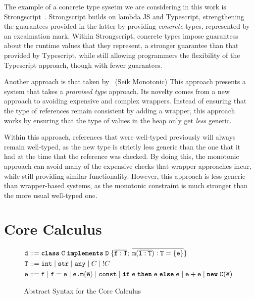 \documentclass{llncs}
\newcommand{\kewif}{\texttt{\textbf{if}}}
\newcommand{\kewthen}{\texttt{\textbf{then}}}
\newcommand{\kewelse}{\texttt{\textbf{else}}}
\newcommand{\kewnew}{\texttt{\textbf{new}}}
\newcommand{\kewclass}{\texttt{\textbf{class}}}
\newcommand{\kewimplements}{\texttt{\textbf{implements}}}
\newcommand{\class}[4]{\ensuremath\kewclass\; \texttt{#1}\; \kewimplements\; \texttt{#2} \;\{#3;\;#4\}}
\newcommand{\field}[2]{\ensuremath \texttt{#1} : \texttt{#2}}
\newcommand{\method}[4]{\ensuremath {\texttt{#1}}({#2}):\texttt{#3} = \{\texttt{#4}\}}
\newcommand{\ifabs}[3]{\kewif \; #1 \;\kewthen\; #2 \;\kewelse\; #3}
\newcommand{\opplus}[2]{#1 + #2}
\newcommand{\newclass}[2]{\kewnew\;\texttt{#1}(#2)}
\newcommand{\strt}{\texttt{str}}
\newcommand{\intt}{\texttt{int}}
\newcommand{\anyt}{\texttt{any}}
\newcommand{\vbar}{\;|\;}
\begin{document}
The example of a concrete type sysetm we are considering in this work is
Strongscript~\cite{stongscript}. Strongscript builds on lambda JS and 
Typescript, strengthening the guarantees provided in the latter by providing
\emph{concrete} types, represented by an excalmation mark. Within Strongscript,
concrete types impose guarantess about the runtime values that they represent, 
a stronger guarantee than that provided by Typescript, while still allowing
programmers the flexibility of the Typescript approach, though with fewer
guarantees.

Another approach is that taken by~\cite{seik-monotonic} (Seik Monotonic)
This approach presents a system that takes a \emph{promised type} approach.
Its novelty comes from a new approach to avoiding expensive and complex
wrappers. Instead of ensuring that the type of references remain consistent
by adding a wrapper, this approach works by ensuring that the type of values in
the heap only get \emph{less} generic.

Within this approach, references that were well-typed previously will always
remain well-typed, as the new type is strictly less generic than the one that
it had at the time that the reference was checked. By doing this, the monotonic
approach can avoid many of the expensive checks that wrapper approaches incur, 
while still providing similar functionality. However, this approach is less
generic than wrapper-based systems, as the monotonic constraint is much stronger
than the more usual well-typed one.

\section{Core Calculus}

\begin{figure}
\begin{align*}
\texttt{d}&::= \class{C}{D}{\overline{\field{f}{T}}}{\overline{\method{m}{\overline{\field{l}{T}}}{T}{e}}}\\
\texttt{T} &::= \intt \vbar \strt \vbar \anyt \vbar C \vbar !C\\
\texttt{e}&::= \texttt{f} \vbar \texttt{f} = \texttt{e} \vbar \texttt{e.m}(\overline{\texttt{e}}) \vbar \texttt{const} \vbar 
\ifabs{\texttt{e}}{\texttt{e}}{\texttt{e}} \vbar \opplus{\texttt{e}}{\texttt{e}} \vbar \newclass{\texttt{C}}{\overline{\texttt{e}}}
\end{align*}

\caption{Abstract Syntax for the Core Calculus}
\end{figure}
\end{document}
